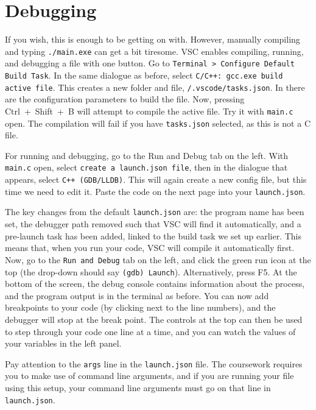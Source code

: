 \documentclass{article}
\newcommand{\code}[1]{\colorbox{codegrey}{\lstinline|#1|}}
\begin{document}
\section{Debugging}
If you wish, this is enough to be getting on with. However, manually compiling and typing \code{./main.exe} can get a bit tiresome. VSC enables compiling, running, and debugging a file with one button. Go to  \code{Terminal > Configure Default Build Task}. In the same dialogue as before, select \code{C/C++: gcc.exe build active file}. This creates a new folder and file, \code{/.vscode/tasks.json}. In there are the configuration parameters to build the file. Now, pressing Ctrl~+~Shift~+~B will attempt to compile the active file. Try it with \code{main.c} open. The compilation will fail if you have \code{tasks.json} selected, as this is not a C file.
\par
For running and debugging, go to the Run and Debug tab on the left. With \code{main.c} open, select \code{create a launch.json file}, then in the dialogue that appears, select \code{C++ (GDB/LLDB)}. This will again create a new config file, but this time we need to edit it. Paste the code on the next page into your \code{launch.json}.
\par
The key changes from the default \code{launch.json} are: the program name has been set, the debugger path removed such that VSC will find it automatically, and a pre-launch task has been added, linked to the build task we set up earlier. This means that, when you run your code, VSC will compile it automatically first. Now, go to the \code{Run and Debug} tab on the left, and click the green run icon at the top (the drop-down should say \code{(gdb) Launch}). Alternatively, press F5. At the bottom of the screen, the debug console contains information about the process, and the program output is in the terminal as before. You can now add breakpoints to your code (by clicking next to the line numbers), and the debugger will stop at the break point. The controls at the top can then be used to step through your code one line at a time, and you can watch the values of your variables in the left panel. 
\par
Pay attention to the \code{args} line in the \code{launch.json} file. The coursework requires you to make use of command line arguments, and if you are running your file using this setup, your command line arguments must go on that line in \code{launch.json}.

\newpage
\end{document}
